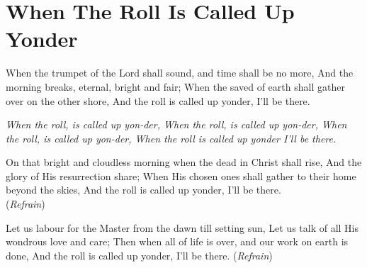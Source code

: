 \chapter{When The Roll Is Called Up Yonder}
\startlines
{\sc When} the trumpet of the Lord shall sound, 
\hfill and time shall be no more,
And the morning breaks, eternal, bright and fair;
When the saved of earth shall gather over on the other shore,
And the roll is called up yonder, I'll be there.

{\it When the roll, is called up yon-der,
When the roll, is called up yon-der,
When the roll, is called up yon-der,
When the roll is called up yonder I'll be there.}

On that bright and cloudless morning 
\hfill when the dead in Christ shall rise,
And the glory of His resurrection share;
When His chosen ones shall gather to their home beyond the skies,
And the roll is called up yonder, I'll be there.
          \hfill({\it Refrain})~~~~~~~~~

Let us labour for the Master from the dawn till setting sun,
Let us talk of all His wondrous love and care;
Then when all of life is over, and our work on earth is done,
And the roll is called up yonder, I'll be there.
          \hfill({\it Refrain})~~~~~~~~~
\stoplines

